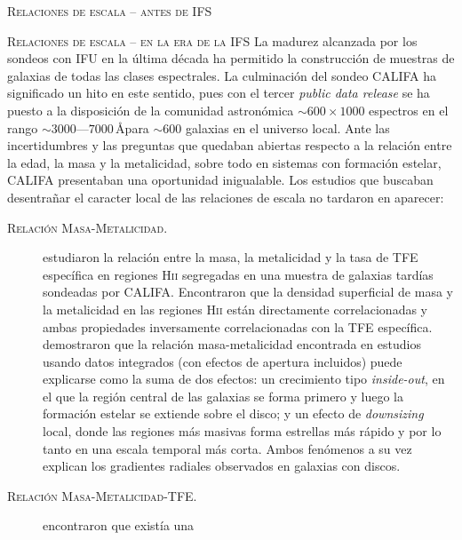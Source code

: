 \documentclass[xcolor=dvipsnames,4pt,hyperref={colorlinks,citecolor=black,linkcolor=black,urlcolor=black}]{beamer}
\begin{document}
\begin{frame}[allowframebreaks]{\textsc{Relaciones de escala -- antes de IFS}}
%
\end{frame}

\begin{frame}[allowframebreaks]{\textsc{Relaciones de escala -- en la era de la IFS}}
%
La madurez alcanzada por los sondeos con IFU en la última década ha permitido la construcción de
muestras de galaxias de todas las clases espectrales. La culminación del sondeo CALIFA
\citep{Sanchez2012, Sanchez2016} ha significado un hito en este sentido, pues con el tercer
\emph{public data release} se ha puesto a la disposición de la comunidad astronómica
$\sim600\times1000$ espectros en el rango $\sim3000$---$7000\,$\AA para $\sim600$ galaxias en el
universo local.
%
Ante las incertidumbres y las preguntas que quedaban abiertas respecto a la relación entre la edad,
la masa y la metalicidad, sobre todo en sistemas con formación estelar, CALIFA presentaban una
oportunidad inigualable. Los estudios que buscaban desentrañar el caracter local de las relaciones
de escala no tardaron en aparecer:
%
\begin{description}
%
\item[\textsc{Relación Masa-Metalicidad.}] \citet{Rosales2012} estudiaron la relación entre la masa,
la metalicidad y la tasa de TFE específica en regiones H\textsc{ii} segregadas en una muestra de
galaxias tardías sondeadas por CALIFA. Encontraron que la densidad superficial de masa y la
metalicidad en las regiones H\textsc{ii} están directamente correlacionadas y ambas propiedades
inversamente correlacionadas con la TFE específica. \citeauthor{Rosales2012} demostraron que la
relación masa-metalicidad encontrada en estudios usando datos integrados (con efectos de apertura
incluidos) puede explicarse como la suma de dos efectos: un crecimiento tipo \emph{inside-out}, en
el que la región central de las galaxias se forma primero y luego la formación estelar se extiende
sobre el disco; y un efecto de \emph{downsizing} local, donde las regiones más masivas forma
estrellas más rápido y por lo tanto en una escala temporal más corta. Ambos fenómenos a su vez
explican los gradientes radiales observados en galaxias con discos.
%
\item[\textsc{Relación Masa-Metalicidad-TFE.}] \citeauthor{Rosales2012} encontraron que existía una

\end{description}
\end{frame}
\end{document}
